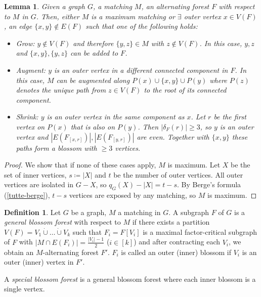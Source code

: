 \documentclass[11pt, a4paper]{article}
\newcommand{\abs}[1]{\left\lvert#1\right\rvert}
\newcommand{\set}[1]{\{#1\}}
\newtheorem{lemma}[theorem]{Lemma}
\theoremstyle{remark}
\theoremstyle{definition}
\newtheorem{definition}[theorem]{Definition}
\begin{document}
\begin{lemma}
	Given a graph $G$, a matching $M$, an alternating forest $F$ with respect
	to $M$ in $G$. Then, either $M$ is a maximum matching or $\exists$
	outer vertex $x\in V(F)$, an edge $\set{x,y}\notin E(F)$ such that one
	of the following holds:
	\begin{itemize}
		\item Grow: $y\notin V(F)$ and therefore $\set{y,z}\in M$ with $z\notin
			V(F)$. In this case, $y,z$ and $\set{x,y},\set{y,z}$ can be added to
		$F$.

		\item Augment: $y$ is an outer vertex in a different connected component in
		$F$. In this case, $M$ can be augmented along $P(x)\cup\set{x,y} \cup
			P(y)$ where $P(z)$ denotes the unique path from $z\in V(F)$ to the
		root of its connected component.

		\item Shrink: $y$ is an outer vertex in the same component as $x$. Let $r$
		be the first vertex on $P(x)$ that is also on $P(y)$. Then
		$\abs{\delta_F(r)}\geq 3$, so $y$ is an outer vertex and
		$\abs{E(F_{[x,r]})},\abs{E(F_{[y,r]})}$ are even. Together with
		$\set{x,y}$ these paths form a blossom with $\geq 3$ vertices.
	\end{itemize}
\end{lemma}
\begin{proof}
	We show that if none of these cases apply, $M$ is maximum. Let $X$ be
	the set of inner vertices, $s\coloneqq\abs{X}$ and $t$ be the number
	of outer vertices. All outer vertices are isolated in $G-X$, so
	$q_G(X)-\abs{X}=t-s$. By Berge's formula (\ref{tutte-berge}), $t-s$
	vertices are exposed by any matching, so $M$ is maximum.
\end{proof}

\begin{definition}\label{def:special-blossom-forest}
	Let $G$ be a graph, $M$ a matching in $G$. A subgraph $F$ of $G$ is a
	\emph{general blossom forest} with respect to $M$ if there exists a
	partition $V(F)=V_1\dot\cup\ldots\dot\cup V_k$ such that $F_i=F[V_i]$
	is a maximal factor-critical subgraph of $F$ with $\abs{M\cap E(F_i)}
		=\frac{\abs{V_i}-1}{2}$ ($i\in [k]$) and after contracting each $V_i$,
	we obtain an $M$-alternating forest $F'$.
	$F_i$ is called an outer (inner) blossom if $V_i$ is an outer (inner)
	vertex in $F'$.

	A \emph{special blossom forest} is a general blossom forest where
	each inner blossom is a single vertex.
\end{definition}
\end{document}
